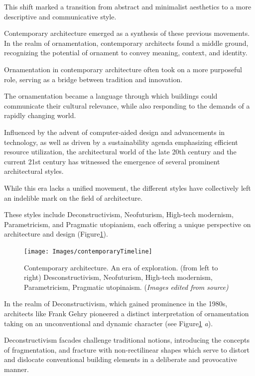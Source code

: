 This shift marked a transition from abstract and minimalist aesthetics to a more descriptive and communicative style.

Contemporary architecture emerged as a synthesis of these previous movements.
In the realm of ornamentation, contemporary architects found a middle ground, recognizing the potential of ornament to convey meaning, context, and identity.

Ornamentation in contemporary architecture often took on a more purposeful role, serving as a bridge between tradition and innovation.

The ornamentation became a language through which buildings could communicate their cultural relevance, while also responding to the demands of a rapidly changing world.

Influenced by the advent of computer-aided design and advancements in technology, as well as driven by a sustainability agenda emphasizing efficient resource utilization, the architectural world of the late 20th century and the current 21st century has witnessed the emergence of several prominent architectural styles.

While this era lacks a unified movement, the different styles have collectively left an indelible mark on the field of architecture.

These styles include Deconstructivism, Neofuturism, High-tech modernism, Parametricism, and Pragmatic utopianism, each offering a unique perspective on architecture and design (Figure\ref{fig:contemporarytimeline}).

     \begin{figure}[htb]
          \centering
          \texttt{[image: Images/contemporaryTimeline]}
          \caption{Contemporary architecture. An era of exploration. (from left to right) Desconstructivism, Neofuturism, High-tech modernism, Parametricism, Pragmatic utopinaism.  (\textit{Images edited from source)}}
          \label{fig:contemporarytimeline}
        \end{figure}


In the realm of Deconstructivism, which gained prominence in the 1980s\cite{Clement2017}, architects like Frank Gehry pioneered a distinct interpretation of ornamentation taking on an unconventional and dynamic character (see Figure\ref{fig:contemporarytimeline} \textit{a}).

Deconstructivism facades challenge traditional notions, introducing the concepts of fragmentation, and fracture with non-rectilinear shapes which serve to distort and dislocate conventional building elements in a deliberate and provocative manner.

